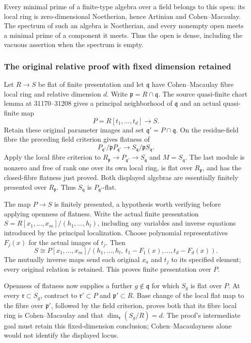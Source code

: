 Every minimal prime of a finite-type algebra over a field belongs to this open: its local ring is zero-dimensional Noetherian, hence Artinian and Cohen--Macaulay. The spectrum of such an algebra is Noetherian, and every nonempty open meets a minimal prime of a component it meets. Thus the open is dense, including the vacuous assertion when the spectrum is empty.

\subsubsection{The original relative proof with fixed dimension retained}\label{algebra-proof-040-the-original-relative-proof-with-fixed-dimension-retained}

Let \(R\to S\) be flat of finite presentation and let \(\mathfrak q\) have Cohen--Macaulay fibre local ring and relative dimension \(d\). Write \(\mathfrak p=R\cap\mathfrak q\). The source quasi-finite chart lemma at 31170--31208 gives a principal neighborhood of \(\mathfrak q\) and an actual quasi-finite map \[
P=R[t_1,\ldots,t_d]\longrightarrow S.
\] Retain these original parameter images and set \(\mathfrak q'=P\cap\mathfrak q\). On the residue-field fibre the preceding field criterion gives flatness of \[
P_{\mathfrak q'}/\mathfrak pP_{\mathfrak q'}
\longrightarrow S_{\mathfrak q}/\mathfrak pS_{\mathfrak q}.
\] Apply the local fibre criterion to \(R_{\mathfrak p}\to P_{\mathfrak q'}\to S_{\mathfrak q}\) and \(M=S_{\mathfrak q}\). The last module is nonzero and free of rank one over its own local ring, is flat over \(R_{\mathfrak p}\), and has the closed-fibre flatness just proved. Both displayed algebras are essentially finitely presented over \(R_{\mathfrak p}\). Thus \(S_{\mathfrak q}\) is \(P_{\mathfrak q'}\)-flat.

The map \(P\to S\) is finitely presented, a hypothesis worth verifying before applying openness of flatness. Write the actual finite presentation \(S=R[x_1,\ldots,x_m]/(h_1,\ldots,h_l)\), including any variables and inverse equations introduced by the principal localization. Choose polynomial representatives \(F_j(x)\) for the actual images of \(t_j\). Then \[
S\cong
P[x_1,\ldots,x_m]/
(h_1,\ldots,h_l,\ t_1-F_1(x),\ldots,t_d-F_d(x)).
\] The mutually inverse maps send each original \(x_a\) and \(t_j\) to its specified element; every original relation is retained. This proves finite presentation over \(P\).

Openness of flatness now supplies a further \(g\notin\mathfrak q\) for which \(S_g\) is flat over \(P\). At every \(\mathfrak r\subset S_g\), contract to \(\mathfrak r'\subset P\) and \(\mathfrak p'\subset R\). Base change of the local flat map to the fibre over \(\mathfrak p'\), followed by the field criterion, proves both that its fibre local ring is Cohen--Macaulay and that \(\dim_{\mathfrak r}(S_g/R)=d\). The proof's intermediate goal must retain this fixed-dimension conclusion; Cohen--Macaulayness alone would not identify the displayed locus.

